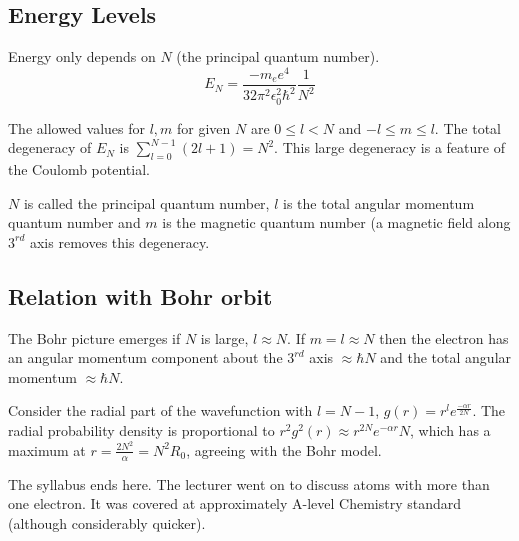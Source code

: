 \documentclass[a4paper]{article}
\newcommand{\eps}{\epsilon_0}
\begin{document}
\subsection{Energy Levels}

Energy only depends on $N$ (the principal quantum number).
\[
E_N = \frac{-m_e e^4}{32 \pi^2 \eps^2 \hbar^2}\frac{1}{N^2}
\]

The allowed values for $l, m$ for given $N$ are $0 \le l < N$ and $-l \le m
\le l$.  The total degeneracy of $E_N$ is $\sum_{l=0}^{N-1}(2l+1) = N^2$.
This large degeneracy is a feature of the Coulomb potential.

$N$ is called the principal quantum number, $l$ is the total angular momentum
quantum number and $m$ is the magnetic quantum number (a magnetic field along
$3^{rd}$ axis removes this degeneracy.

\subsection{Relation with Bohr orbit}

The Bohr picture emerges if $N$ is large, $l \approx N$.  If $m=l \approx N$
then the electron has an angular momentum component about the $3^{rd}$ axis
$\approx \hbar N$ and the total angular momentum $\approx \hbar N$.

Consider the radial part of the wavefunction with $l = N-1$, $g(r) = r^l
e^{\frac{-\alpha r}{2 N}}$.  The radial probability density is proportional
to $r^2 g^2(r) \approx r^{2 N} e^{-\alpha r}{N}$, which has a maximum at
$r = \frac{2 N^2}{\alpha} = N^2 R_0$, agreeing with the Bohr model.

{\noindent \hrulefill}

The syllabus ends here.  The lecturer went on to discuss atoms with more 
than one electron.  It was covered at approximately A-level Chemistry standard
(although considerably quicker).
\end{document}
